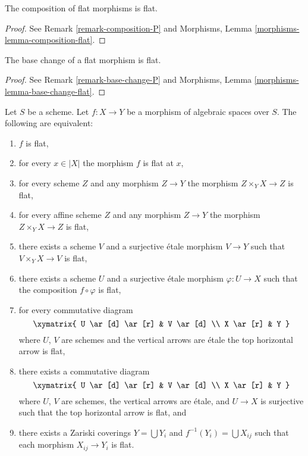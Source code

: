\begin{lemma}
\label{lemma-composition-flat}
The composition of flat morphisms is flat.
\end{lemma}

\begin{proof}
See Remark \ref{remark-composition-P} and
Morphisms, Lemma \ref{morphisms-lemma-composition-flat}.
\end{proof}

\begin{lemma}
\label{lemma-base-change-flat}
The base change of a flat morphism is flat.
\end{lemma}

\begin{proof}
See Remark \ref{remark-base-change-P} and
Morphisms, Lemma \ref{morphisms-lemma-base-change-flat}.
\end{proof}

\begin{lemma}
\label{lemma-flat-local}
Let $S$ be a scheme.
Let $f : X \to Y$ be a morphism of algebraic spaces over $S$.
The following are equivalent:
\begin{enumerate}
\item $f$ is flat,
\item for every $x \in |X|$ the morphism $f$ is flat at $x$,
\item for every scheme $Z$ and any morphism $Z \to Y$ the morphism
$Z \times_Y X \to Z$ is flat,
\item for every affine scheme $Z$ and any morphism
$Z \to Y$ the morphism $Z \times_Y X \to Z$ is flat,
\item there exists a scheme $V$ and a surjective \'etale morphism
$V \to Y$ such that $V \times_Y X \to V$ is flat,
\item there exists a scheme $U$ and a surjective \'etale morphism
$\varphi : U \to X$ such that the composition $f \circ \varphi$
is flat,
\item for every commutative diagram
$$
\xymatrix{
U \ar[d] \ar[r] & V \ar[d] \\
X \ar[r] & Y
}
$$
where $U$, $V$ are schemes and the vertical arrows are \'etale
the top horizontal arrow is flat,
\item there exists a commutative diagram
$$
\xymatrix{
U \ar[d] \ar[r] & V \ar[d] \\
X \ar[r] & Y
}
$$
where $U$, $V$ are schemes, the vertical arrows are \'etale, and
$U \to X$ is surjective such that the top horizontal arrow is flat, and
\item there exists a Zariski coverings $Y = \bigcup Y_i$ and
$f^{-1}(Y_i) = \bigcup X_{ij}$ such that
each morphism $X_{ij} \to Y_i$ is flat.
\end{enumerate}
\end{lemma}

